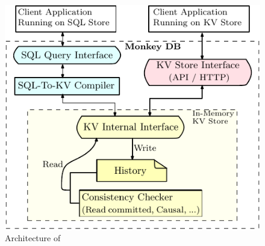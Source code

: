 \begin{figure}
\includegraphics[scale=0.8]{Sources/sql/figures/block_dia.pdf}
\caption{Architecture of \tool{}}
\label{fig:block_dia}
\end{figure}




